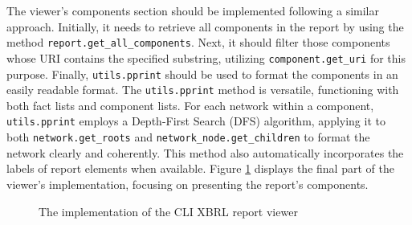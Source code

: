 The viewer's components section should be implemented following a similar approach.  
Initially, it needs to retrieve all components in the report by using the method \texttt{report.get\_all\_components}.  
Next, it should filter those components whose URI contains the specified substring, utilizing \texttt{component.get\_uri} for this purpose.  
Finally, \texttt{utils.pprint} should be used to format the components in an easily readable format.  
The \texttt{utils.pprint} method is versatile, functioning with both fact lists and component lists.  
For each network within a component, \texttt{utils.pprint} employs a Depth-First Search (DFS) algorithm,  
applying it to both \texttt{network.get\_roots} and \texttt{network\_node.get\_children} to format the network clearly and coherently.  
This method also automatically incorporates the labels of report elements when available.  
Figure \ref{fig:viewer_4} displays the final part of the viewer's implementation, focusing on presenting the report's components.


\begin{figure}[H]
    \centering
    
    \caption{The implementation of the CLI XBRL report viewer}
    \label{fig:viewer_4}
\end{figure}

